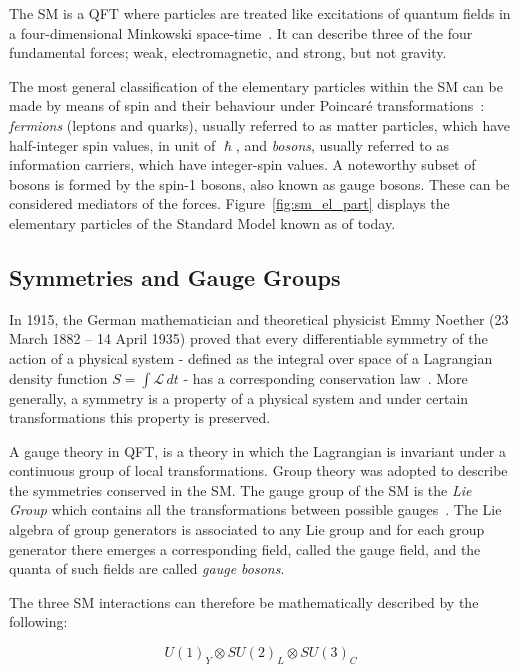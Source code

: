		The \ac{SM} is a \ac{QFT} where particles are treated like excitations of quantum fields in a four-dimensional Minkowski space-time~\cite{Peskin1995}. It can describe three of the four fundamental forces; weak, electromagnetic, and strong, but not gravity.

		The most general classification of the elementary particles within the \ac{SM} can be made by means of spin and their behaviour under Poincaré transformations~\cite{Cottingham1998}: \textit{fermions} (leptons and quarks), usually referred to as matter particles, which have half-integer spin values, in unit of $\hslash$, and \textit{bosons}, usually referred to as information carriers, which have integer-spin values. A noteworthy subset of bosons is formed by the spin-1 bosons, also known as gauge bosons. These can be considered mediators of the forces. Figure~\ref{fig:sm_el_part} displays the elementary particles of the Standard Model known as of today.



		\subsection*{Symmetries and Gauge Groups}

			In 1915, the German mathematician and theoretical physicist Emmy Noether (23 March 1882 – 14 April 1935) proved that every differentiable symmetry of the action of a physical system - defined as the integral over space of a Lagrangian density function $S = \int \mathcal{L}\, dt$ - has a corresponding conservation law~\cite{lederman2004symmetry}. More generally, a symmetry is a property of a physical system and under certain transformations this property is preserved. 

			A gauge theory in \ac{QFT}, is a theory in which the Lagrangian is invariant under a continuous group of local transformations. Group theory was adopted to describe the symmetries conserved in the \ac{SM}. The gauge group of the \ac{SM} is the \emph{Lie Group} which contains all the transformations between possible gauges~\cite{Cottingham1998}. The Lie algebra of group generators is associated to any Lie group and for each group generator there emerges a corresponding field, called the gauge field, and the quanta of such fields are called \emph{gauge bosons}.
			
			The three \ac{SM} interactions can therefore be mathematically described by the following:

			\begin{equation}
			\label{eq:SM_gaugeSym}
				U(1)_Y \otimes SU(2)_L \otimes SU(3)_C
			\end{equation}

